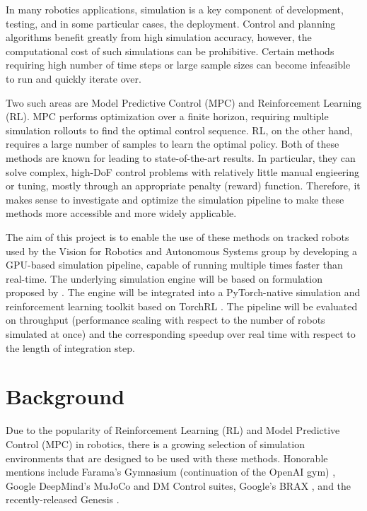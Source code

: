 \documentclass[a4paper,12pt]{article}
\begin{document}
In many robotics applications, simulation is a key component of development, testing, and in some particular cases, the deployment. Control and planning algorithms benefit greatly from high simulation accuracy, however, the computational cost of such simulations can be prohibitive. Certain methods requiring high number of time steps or large sample sizes can become infeasible to run and quickly iterate over. 

Two such areas are Model Predictive Control (MPC) and Reinforcement Learning (RL). MPC performs optimization over a finite horizon, requiring multiple simulation rollouts to find the optimal control sequence. RL, on the other hand, requires a large number of samples to learn the optimal policy. Both of these methods are known for leading to state-of-the-art results. In particular, they can solve complex, high-DoF control problems with relatively little manual engieering or tuning, mostly through an appropriate penalty (reward) function. Therefore, it makes sense to investigate and optimize the simulation pipeline to make these methods more accessible and more widely applicable.

The aim of this project is to enable the use of these methods on tracked robots used by the Vision for Robotics and Autonomous Systems group by developing a GPU-based simulation pipeline, capable of running multiple times faster than real-time. The underlying simulation engine will be based on formulation proposed by \citet{Agishev_2024}. The engine will be integrated into a PyTorch-native \citep{paszke2019pytorchimperativestylehighperformance} simulation and reinforcement learning toolkit based on TorchRL \citep{bou2023torchrldatadrivendecisionmakinglibrary}. The pipeline will be evaluated on throughput (performance scaling with respect to the number of robots simulated at once) and the corresponding speedup over real time with respect to the length of integration step.





\clearpage


\section{Background}
\label{sec:background}

Due to the popularity of Reinforcement Learning (RL) and Model Predictive Control (MPC) in robotics, there is a growing selection of simulation environments that are designed to be used with these methods. Honorable mentions include Farama's Gymnasium (continuation of the OpenAI gym) \citep{towers2024gymnasiumstandardinterfacereinforcement}, Google DeepMind's MuJoCo \citep{todorov2012mujoco} and DM Control suites, Google's BRAX \citep{brax2021github}, and the recently-released Genesis \citep{Genesis}.
\end{document}
